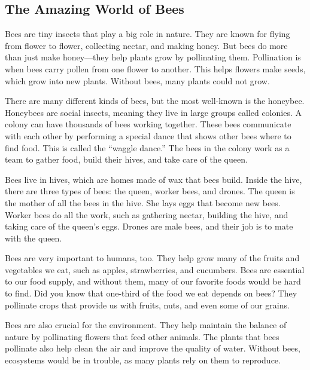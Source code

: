 \documentclass[12pt]{article}
\begin{document}
\onehalfspacing

\subsection*{The Amazing World of Bees}

\begin{tcolorbox}[colframe=black!40, colback=gray!5]
\begin{spacing}{1.15}
    Bees are tiny insects that play a big role in nature. They are known for flying from flower to flower, collecting nectar, and making honey. But bees do more than just make honey—they help plants grow by pollinating them. Pollination is when bees carry pollen from one flower to another. This helps flowers make seeds, which grow into new plants. Without bees, many plants could not grow.

    There are many different kinds of bees, but the most well-known is the honeybee. Honeybees are social insects, meaning they live in large groups called colonies. A colony can have thousands of bees working together. These bees communicate with each other by performing a special dance that shows other bees where to find food. This is called the “waggle dance.” The bees in the colony work as a team to gather food, build their hives, and take care of the queen.

    Bees live in hives, which are homes made of wax that bees build. Inside the hive, there are three types of bees: the queen, worker bees, and drones. The queen is the mother of all the bees in the hive. She lays eggs that become new bees. Worker bees do all the work, such as gathering nectar, building the hive, and taking care of the queen’s eggs. Drones are male bees, and their job is to mate with the queen.

    Bees are very important to humans, too. They help grow many of the fruits and vegetables we eat, such as apples, strawberries, and cucumbers. Bees are essential to our food supply, and without them, many of our favorite foods would be hard to find. Did you know that one-third of the food we eat depends on bees? They pollinate crops that provide us with fruits, nuts, and even some of our grains.

    Bees are also crucial for the environment. They help maintain the balance of nature by pollinating flowers that feed other animals. The plants that bees pollinate also help clean the air and improve the quality of water. Without bees, ecosystems would be in trouble, as many plants rely on them to reproduce.


\end{spacing}
\end{tcolorbox}
\end{document}
